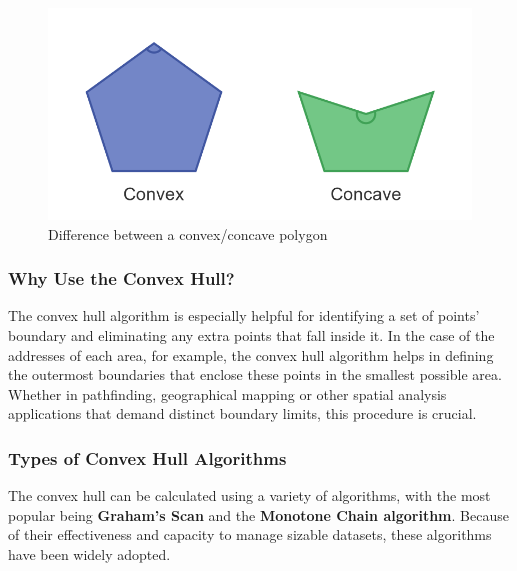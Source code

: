     \begin{figure} [H]
        \centering
        \includegraphics [width=1\textwidth] {images/andreas/areaBorders/convexConcave.png}
        \caption{Difference between a convex/concave polygon \autocite{Andi:concaveConvex}}
        
    \end{figure}

    \subsubsection{Why Use the Convex Hull?}
    The convex hull algorithm is especially helpful for identifying a set of points' boundary and eliminating any extra points that fall inside it. In the case of the addresses of each area, for example, the convex hull algorithm helps in defining the outermost boundaries that enclose these points in the smallest possible area. Whether in pathfinding, geographical mapping or other spatial analysis applications that demand distinct boundary limits, this procedure is crucial.

    \subsubsection{Types of Convex Hull Algorithms}
    The convex hull can be calculated using a variety of algorithms, with the most popular being \textbf{Graham's Scan} and the \textbf{Monotone Chain algorithm}. Because of their effectiveness and capacity to manage sizable datasets, these algorithms have been widely adopted.

    \blankLine

